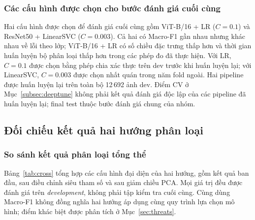 \subsubsection{Các cấu hình được chọn cho bước đánh giá cuối cùng}
Hai cấu hình được chọn để đánh giá cuối cùng gồm ViT-B/16 + LR ($C=0.1$) và ResNet50 + LinearSVC ($C=0.003$). Cả hai có Macro-F1 gần nhau nhưng khác nhau về lỗi theo lớp; ViT-B/16 + LR có số chiều đặc trưng thấp hơn và thời gian huấn luyện bộ phân loại thấp hơn trong các phép đo đã thực hiện. Với LR, $C=0.1$ được chọn bằng phép chia xác thực trên dev trước khi huấn luyện lại; với LinearSVC, $C=0.003$ được chọn nhất quán trong năm fold ngoài. Hai pipeline được huấn luyện lại trên toàn bộ 12\,692 ảnh dev. Điểm CV ở Mục~\ref{subsec:deeptune} không phải kết quả đánh giá độc lập của các pipeline đã huấn luyện lại; final test thuộc bước đánh giá chung của nhóm.

\subsection{Đối chiếu kết quả hai hướng phân loại}
\label{sec:compare}
\subsubsection{So sánh kết quả phân loại tổng thể}
Bảng~\ref{tab:cross} tổng hợp các cấu hình đại diện của hai hướng, gồm kết quả ban đầu, sau điều chỉnh siêu tham số và sau giảm chiều PCA. Mọi giá trị đều được đánh giá trên \textit{development}, không phải tập kiểm tra cuối cùng. Cùng dùng Macro-F1 không đồng nghĩa hai hướng áp dụng cùng quy trình lựa chọn mô hình; điểm khác biệt được phân tích ở Mục~\ref{sec:threats}.

